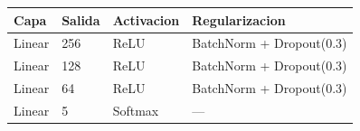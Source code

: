 \begin{tabular}{llll}
\toprule
Capa & Salida & Activacion & Regularizacion \\
\midrule
Linear & 256 & ReLU & BatchNorm + Dropout(0.3) \\
Linear & 128 & ReLU & BatchNorm + Dropout(0.3) \\
Linear & 64  & ReLU & BatchNorm + Dropout(0.3) \\
Linear & 5   & Softmax & --- \\
\bottomrule
\end{tabular}